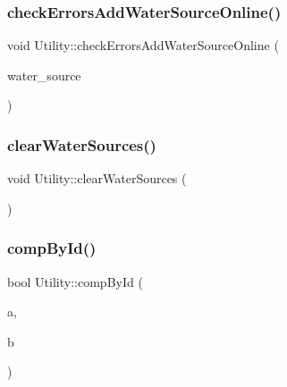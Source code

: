 \mbox{\label{classUtility_a0674d7d95f4d6595f7e01817a4d84a98}} 
\subsubsection{\texorpdfstring{check\+Errors\+Add\+Water\+Source\+Online()}{checkErrorsAddWaterSourceOnline()}}
{\footnotesize\ttfamily void Utility\+::check\+Errors\+Add\+Water\+Source\+Online (\begin{DoxyParamCaption}\item[{\mbox{\hyperlink{classWaterSource}{Water\+Source}} $\ast$}]{water\+\_\+source }\end{DoxyParamCaption})}

\mbox{\label{classUtility_aa770f28c76e84747bbd643f55dbc4dd5}} 
\subsubsection{\texorpdfstring{clear\+Water\+Sources()}{clearWaterSources()}}
{\footnotesize\ttfamily void Utility\+::clear\+Water\+Sources (\begin{DoxyParamCaption}{ }\end{DoxyParamCaption})}

\mbox{\label{classUtility_a2156ad82d86ed63a22f932a90062ed29}} 
\subsubsection{\texorpdfstring{comp\+By\+Id()}{compById()}}
{\footnotesize\ttfamily bool Utility\+::comp\+By\+Id (\begin{DoxyParamCaption}\item[{\mbox{\hyperlink{classUtility}{Utility}} $\ast$}]{a,  }\item[{\mbox{\hyperlink{classUtility}{Utility}} $\ast$}]{b }\end{DoxyParamCaption})\hspace{0.3cm}{\ttfamily [static]}}

